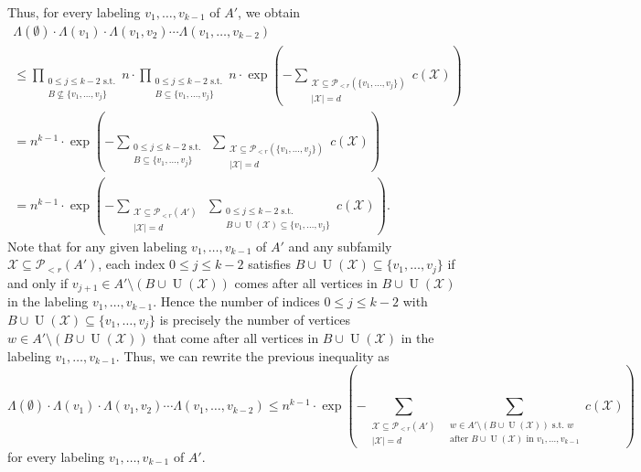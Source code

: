 Thus, for every labeling $v_1,\dots,v_{k-1}$ of $A'$, we obtain
\begin{multline*}
\Lambda(\emptyset)\cdot \Lambda(v_1)\cdot \Lambda(v_1, v_2)\dotsm \Lambda(v_1,\dots,v_{k-2})\\
\leq \prod_{\substack{0\leq j\leq k-2\text{ s.t.}\\B\not\subseteq \lbrace v_1,\dots,v_j\rbrace}}n\cdot \prod_{\substack{0\leq j\leq k-2\text{ s.t.}\\B\subseteq \lbrace v_1,\dots,v_j\rbrace}}n\cdot \exp\left(-\sum_{\substack{\mathcal{X}\subseteq \mathcal{P}\!_{<r}(\lbrace v_1,\dots,v_j\rbrace)\\\vert \mathcal{X}\vert=d}}c(\mathcal{X})\right)\\
=n^{k-1}\cdot \exp\left(-\sum_{\substack{0\leq j\leq k-2\text{ s.t.}\\B\subseteq \lbrace v_1,\dots,v_j\rbrace}}\ \sum_{\substack{\mathcal{X}\subseteq \mathcal{P}\!_{<r}(\lbrace v_1,\dots,v_j\rbrace)\\\vert \mathcal{X}\vert=d}}c(\mathcal{X})\right)\\
=n^{k-1}\cdot \exp\left(-\sum_{\substack{\mathcal{X}\subseteq \mathcal{P}\!_{<r}(A')\\\vert \mathcal{X}\vert=d}}\ \sum_{\substack{0\leq j\leq k-2\text{ s.t.}\\B\cup \operatorname{U}(\mathcal{X})\subseteq \lbrace v_1,\dots,v_j\rbrace}}c(\mathcal{X})\right).
\end{multline*}
Note that for any given labeling $v_1,\dots,v_{k-1}$ of $A'$ and any subfamily $\mathcal{X}\subseteq \mathcal{P}\!_{<r}(A')$, each index $0\leq j\leq k-2$ satisfies $B\cup \operatorname{U}(\mathcal{X})\subseteq \lbrace v_1,\dots,v_j\rbrace$ if and only if $v_{j+1}\in A'\setminus (B\cup \operatorname{U}(\mathcal{X}))$ comes after all vertices in $B\cup \operatorname{U}(\mathcal{X})$ in the labeling $v_1,\dots,v_{k-1}$. Hence the number of indices $0\leq j\leq k-2$ with $B\cup \operatorname{U}(\mathcal{X})\subseteq \lbrace v_1,\dots,v_j\rbrace$ is precisely the number of vertices $w\in A'\setminus (B\cup \operatorname{U}(\mathcal{X}))$ that come after all vertices in $B\cup \operatorname{U}(\mathcal{X})$ in the labeling $v_1,\dots,v_{k-1}$. Thus, we can rewrite the previous inequality as
\[\Lambda(\emptyset)\cdot \Lambda(v_1)\cdot \Lambda(v_1, v_2)\dotsm \Lambda(v_1,\dots,v_{k-2})\leq n^{k-1}\cdot \exp\left(-\sum_{\substack{\mathcal{X}\subseteq \mathcal{P}\!_{<r}(A')\\\vert \mathcal{X}\vert=d}}\ \sum_{\substack{w\in A'\setminus(B\cup \operatorname{U}(\mathcal{X}))\text{ s.t. }w\\\text{after }B\cup \operatorname{U}(\mathcal{X})\text{ in }v_1,\dots,v_{k-1}}}c(\mathcal{X})\right)\]
for every labeling $v_1,\dots,v_{k-1}$ of $A'$.


